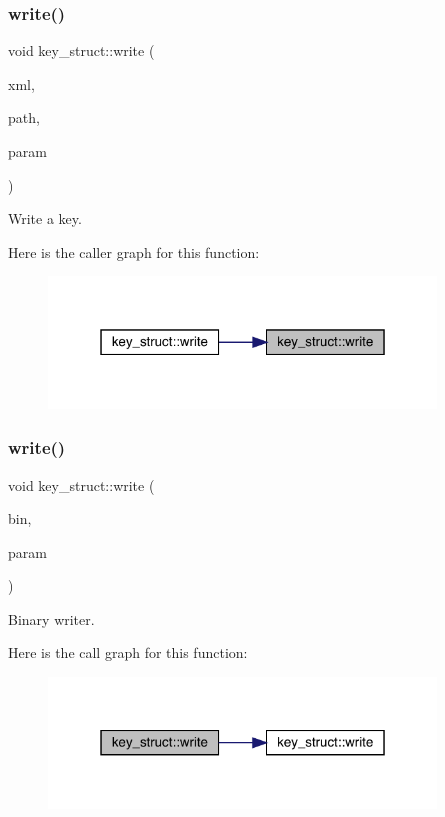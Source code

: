 \subsubsection{\texorpdfstring{write()}{write()}\hspace{0.1cm}{\footnotesize\ttfamily [1/2]}}
{\footnotesize\ttfamily void key\+\_\+struct\+::write (\begin{DoxyParamCaption}\item[{X\+M\+L\+Writer \&}]{xml,  }\item[{const std\+::string \&}]{path,  }\item[{const \mbox{\hyperlink{structkey__struct_1_1KeyHadronSUNNPartNPtIrrep__t}{Key\+Hadron\+S\+U\+N\+N\+Part\+N\+Pt\+Irrep\+\_\+t}} \&}]{param }\end{DoxyParamCaption})}



Write a key. 

Here is the caller graph for this function\+:
\nopagebreak
\begin{figure}[H]
\begin{center}
\leavevmode
\includegraphics[width=292pt]{da/df3/namespacekey__struct_ac9ae019c63b9f6291b3cf45bfc51d147_icgraph}
\end{center}
\end{figure}
\mbox{\label{namespacekey__struct_af7f6bb4bafd1c1c2477ba7e3d87b65be}} 
\subsubsection{\texorpdfstring{write()}{write()}\hspace{0.1cm}{\footnotesize\ttfamily [2/2]}}
{\footnotesize\ttfamily void key\+\_\+struct\+::write (\begin{DoxyParamCaption}\item[{Binary\+Writer \&}]{bin,  }\item[{const \mbox{\hyperlink{structkey__struct_1_1KeyHadronSUNNPartNPtIrrep__t}{Key\+Hadron\+S\+U\+N\+N\+Part\+N\+Pt\+Irrep\+\_\+t}} \&}]{param }\end{DoxyParamCaption})}



Binary writer. 

Here is the call graph for this function\+:
\nopagebreak
\begin{figure}[H]
\begin{center}
\leavevmode
\includegraphics[width=292pt]{da/df3/namespacekey__struct_af7f6bb4bafd1c1c2477ba7e3d87b65be_cgraph}
\end{center}
\end{figure}
